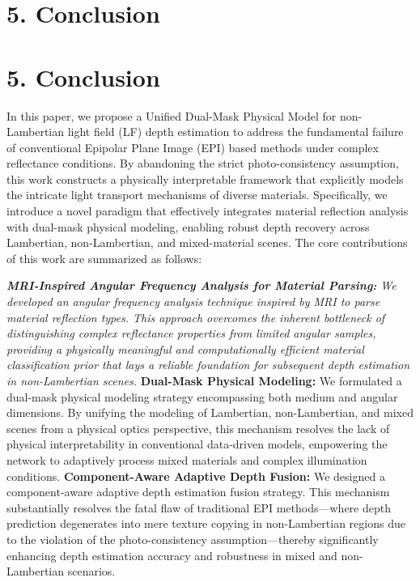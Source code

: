 \section{5. Conclusion}

\section{5. Conclusion}

In this paper, we propose a Unified Dual-Mask Physical Model for non-Lambertian light field (LF) depth estimation to address the fundamental failure of conventional Epipolar Plane Image (EPI) based methods under complex reflectance conditions. By abandoning the strict photo-consistency assumption, this work constructs a physically interpretable framework that explicitly models the intricate light transport mechanisms of diverse materials. Specifically, we introduce a novel paradigm that effectively integrates material reflection analysis with dual-mask physical modeling, enabling robust depth recovery across Lambertian, non-Lambertian, and mixed-material scenes. The core contributions of this work are summarized as follows:

\textit{ \textbf{MRI-Inspired Angular Frequency Analysis for Material Parsing:} We developed an angular frequency analysis technique inspired by MRI to parse material reflection types. This approach overcomes the inherent bottleneck of distinguishing complex reflectance properties from limited angular samples, providing a physically meaningful and computationally efficient material classification prior that lays a reliable foundation for subsequent depth estimation in non-Lambertian scenes.
} \textbf{Dual-Mask Physical Modeling:} We formulated a dual-mask physical modeling strategy encompassing both medium and angular dimensions. By unifying the modeling of Lambertian, non-Lambertian, and mixed scenes from a physical optics perspective, this mechanism resolves the lack of physical interpretability in conventional data-driven models, empowering the network to adaptively process mixed materials and complex illumination conditions.
\textbf{Component-Aware Adaptive Depth Fusion:} We designed a component-aware adaptive depth estimation fusion strategy. This mechanism substantially resolves the fatal flaw of traditional EPI methods—where depth prediction degenerates into mere texture copying in non-Lambertian regions due to the violation of the photo-consistency assumption—thereby significantly enhancing depth estimation accuracy and robustness in mixed and non-Lambertian scenarios.


